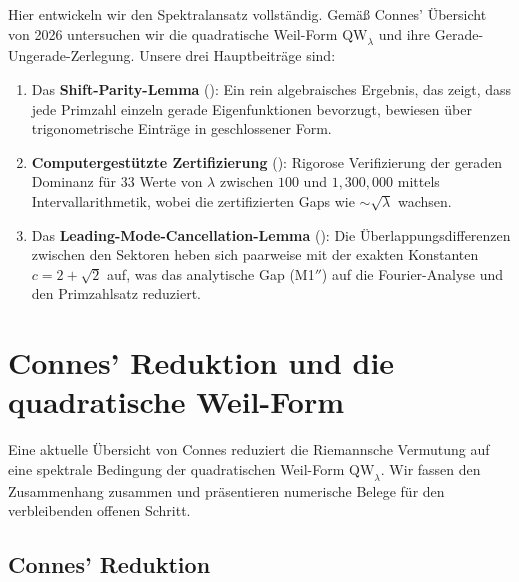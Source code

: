 \documentclass[12pt,a4paper]{article}
\theoremstyle{definition}
\theoremstyle{remark}
\begin{document}
Hier entwickeln wir den Spektralansatz vollständig. Gemäß Connes' Übersicht von 2026 \cite{Connes2025} untersuchen wir die quadratische Weil-Form $\mathrm{QW}_\lambda$ und ihre Gerade-Ungerade-Zerlegung. Unsere drei Hauptbeiträge sind:
\begin{enumerate}
  \item Das \textbf{Shift-Parity-Lemma} (): Ein rein algebraisches Ergebnis, das zeigt, dass jede Primzahl einzeln gerade Eigenfunktionen bevorzugt, bewiesen über trigonometrische Einträge in geschlossener Form.
  \item \textbf{Computergestützte Zertifizierung} (): Rigorose Verifizierung der geraden Dominanz für $33$ Werte von $\lambda$ zwischen $100$ und $1{,}300{,}000$ mittels Intervallarithmetik, wobei die zertifizierten Gaps wie $\sim\!\sqrt{\lambda}$ wachsen.
  \item Das \textbf{Leading-Mode-Cancellation-Lemma} (): Die Überlappungsdifferenzen zwischen den Sektoren heben sich paarweise mit der exakten Konstanten $c = 2 + \sqrt{2}$ auf, was das analytische Gap (M1$''$) auf die Fourier-Analyse und den Primzahlsatz reduziert.
\end{enumerate}


\section{Connes' Reduktion und die quadratische Weil-Form}
\label{sec:connes}

Eine aktuelle Übersicht von Connes \cite{Connes2025} reduziert die Riemannsche Vermutung auf eine spektrale Bedingung der quadratischen Weil-Form $\mathrm{QW}_\lambda$. Wir fassen den Zusammenhang zusammen und präsentieren numerische Belege für den verbleibenden offenen Schritt.

\subsection{Connes' Reduktion}
\end{document}
